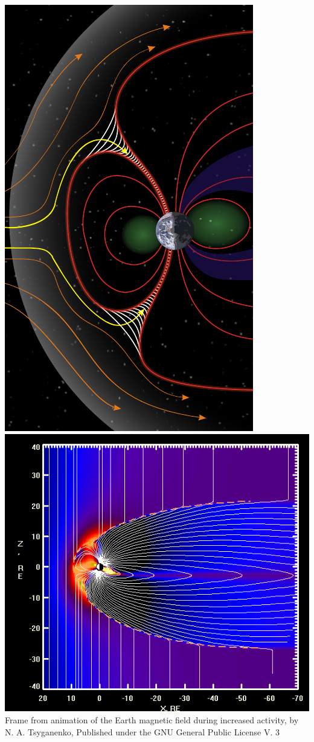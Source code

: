 \documentclass{beamer}
\begin{document}
\begin{frame}
\begin{columns}
\begin{column}{0.5\linewidth}
{%
\includegraphics[width=0.8\linewidth]{Structure_of_the_magnetosphere_Nasa.pdf}%
}%
{
\includegraphics[width=\linewidth]{Tsyganenko1.png}
{\color{gray} Frame from animation of the Earth magnetic field during increased activity, by N. A. Tsyganenko, Published under the GNU General Public License V. 3 }
}
\end{column}
\end{columns}
\end{frame}
\end{document}

